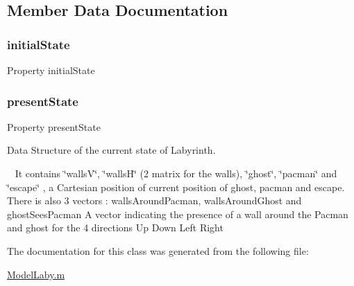 \subsection{Member Data Documentation}
\mbox{\label{class_model_laby_acd9263acfa96c9138afdf497e55acc24}} 
\subsubsection{\texorpdfstring{initial\+State}{initialState}}
{\footnotesize\ttfamily Property initial\+State}

\mbox{\label{class_model_laby_a9624cc7c421a50fa5086b0ebd0cd5fe3}} 
\subsubsection{\texorpdfstring{present\+State}{presentState}}
{\footnotesize\ttfamily Property present\+State}



Data Structure of the current state of Labyrinth. 

~\newline
 It contains \char`\"{}walls\+V\char`\"{}, \char`\"{}walls\+H\char`\"{} (2 matrix for the walls), \char`\"{}ghost\char`\"{}, \char`\"{}pacman\char`\"{} and \char`\"{}escape\char`\"{} , a Cartesian position of current position of ghost, pacman and escape. ~\newline
There is also 3 vectors \+: \textquotesingle{}walls\+Around\+Pacman\textquotesingle{}, \textquotesingle{}walls\+Around\+Ghost\textquotesingle{} and \textquotesingle{}ghost\+Sees\+Pacman\textquotesingle{} A vector indicating the presence of a wall around the Pacman and ghost for the 4 directions Up Down Left Right 

The documentation for this class was generated from the following file\+:\begin{DoxyCompactItemize}
\item 
\hyperlink{_model_laby_8m}{Model\+Laby.\+m}\end{DoxyCompactItemize}
